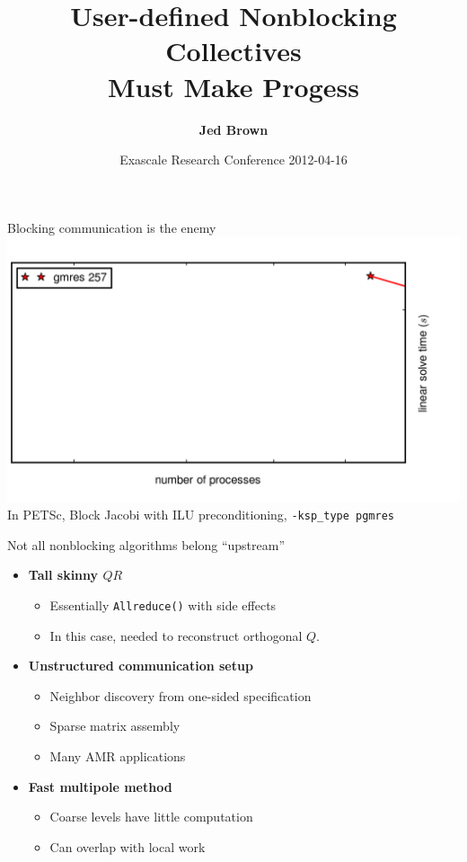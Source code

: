 \documentclass{beamer}
\title{User-defined Nonblocking Collectives \\ Must Make Progess}
\author{{\bf Jed Brown}}
\institute
{
  {Mathematics and Computer Science Division, Argonne National Laboratory}
}
\date{Exascale Research Conference 2012-04-16}
\begin{document}
\lstset{language=C}
\normalem

\begin{frame}
  \titlepage
\end{frame}

\begin{frame}{Blocking communication is the enemy}
  \includegraphics{figures/PipelinedGMRES} \\
  In PETSc, Block Jacobi with ILU preconditioning, {\tt -ksp\_type pgmres}
\end{frame}

\begin{frame}{Not all nonblocking algorithms belong ``upstream''}
  \begin{itemize}
  \item{\bf Tall skinny $QR$}
    \begin{itemize}
    \item Essentially {\tt Allreduce()} with side effects
    \item In this case, needed to reconstruct orthogonal $Q$.
    \end{itemize}
  \item{\bf Unstructured communication setup}
    \begin{itemize}
    \item Neighbor discovery from one-sided specification
    \item Sparse matrix assembly
    \item Many AMR applications
    \end{itemize}
  \item{\bf Fast multipole method}
    \begin{itemize}
    \item Coarse levels have little computation
    \item Can overlap with local work
    \end{itemize}
  \end{itemize}
\end{frame}
\end{document}
